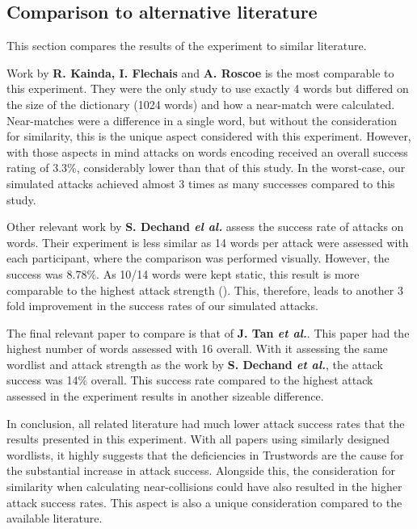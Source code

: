 \subsection*{Comparison to alternative literature}
This section compares the results of the experiment to similar literature.

Work by \textbf{R. Kainda, I. Flechais} and \textbf{A. Roscoe}\cite{kainda2009usability}  is the most comparable to this experiment. They were the only study to use exactly 4 words but differed on the size of the dictionary (1024 words) and how a near-match were calculated. Near-matches were a difference in a single word, but without the consideration for similarity, this is the unique aspect considered with this experiment. However, with those aspects in mind attacks on words encoding received an overall success rating of 3.3\%, considerably lower than that of this study. In the worst-case, our simulated attacks achieved almost 3 times as many successes compared to this study.

Other relevant work by \textbf{S. Dechand \textit{el al.}}\cite{dechand2016empirical} assess the success rate of attacks on words. Their experiment is less similar as 14 words per attack were assessed with each participant, where the comparison was performed visually. However, the success was 8.78\%. As 10/14 words were kept static, this result is more comparable to the highest attack strength (\XOOX). This, therefore, leads to another 3 fold improvement in the success rates of our simulated attacks. 

The final relevant paper to compare is that of \textbf{J. Tan \textit{et al.}}\cite{tan2017can}. This paper had the highest number of words assessed with 16 overall. With it assessing the same wordlist and attack strength as the work by \textbf{S. Dechand \textit{et al.}}\cite{dechand2016empirical}, the attack success was 14\% overall. This success rate compared to the highest attack assessed in the experiment results in another sizeable difference.

In conclusion, all related literature had much lower attack success rates that the results presented in this experiment. With all papers using similarly designed wordlists, it highly suggests that the deficiencies in Trustwords are the cause for the substantial increase in attack success. Alongside this, the consideration for similarity when calculating near-collisions could have also resulted in the higher attack success rates. This aspect is also a unique consideration compared to the available literature.